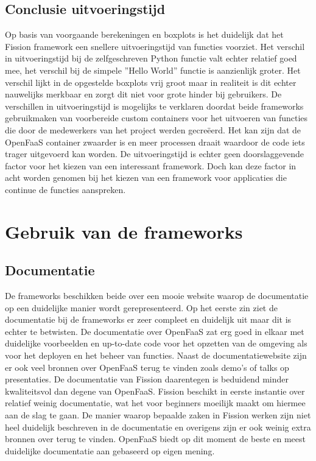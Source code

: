 \subsection{Conclusie uitvoeringstijd}
Op basis van voorgaande berekeningen en boxplots is het duidelijk dat het Fission framework een snellere uitvoeringstijd van functies voorziet. Het verschil in uitvoeringstijd bij de zelfgeschreven Python functie valt echter relatief goed mee, het verschil bij de simpele ''Hello World'' functie is aanzienlijk groter. Het verschil lijkt in de opgestelde boxplots vrij groot maar in realiteit is dit echter nauwelijks merkbaar en zorgt dit niet voor grote hinder bij gebruikers. De verschillen in uitvoeringstijd is mogelijks te verklaren doordat beide frameworks gebruikmaken van voorbereide custom containers voor het uitvoeren van functies die door de medewerkers van het project werden gecreëerd. Het kan zijn dat de OpenFaaS container zwaarder is en meer processen draait waardoor de code iets trager uitgevoerd kan worden. De uitvoeringstijd is echter geen doorslaggevende factor voor het kiezen van een interessant framework. Doch kan deze factor in acht worden genomen bij het kiezen van een framework voor applicaties die continue de functies aanspreken.

\section{Gebruik van de frameworks}
\subsection{Documentatie}
De frameworks beschikken beide over een mooie website waarop de documentatie op een duidelijke manier wordt gerepresenteerd. Op het eerste zin ziet de documentatie bij de frameworks er zeer compleet en duidelijk uit maar dit is echter te betwisten. De documentatie over OpenFaaS zat erg goed in elkaar met duidelijke voorbeelden en up-to-date code voor het opzetten van de omgeving als voor het deployen en het beheer van functies. Naast de documentatiewebsite zijn er ook veel bronnen over OpenFaaS terug te vinden zoals demo's of talks op presentaties. De documentatie van Fission daarentegen is beduidend minder kwaliteitsvol dan degene van OpenFaaS. Fission beschikt in eerste instantie over relatief weinig documentatie, wat het voor beginners moeilijk maakt om hiermee aan de slag te gaan. De manier waarop bepaalde zaken in Fission werken zijn niet heel duidelijk beschreven in de documentatie en overigens zijn er ook weinig extra bronnen over terug te vinden. OpenFaaS biedt op dit moment de beste en meest duidelijke documentatie aan gebaseerd op eigen mening.

